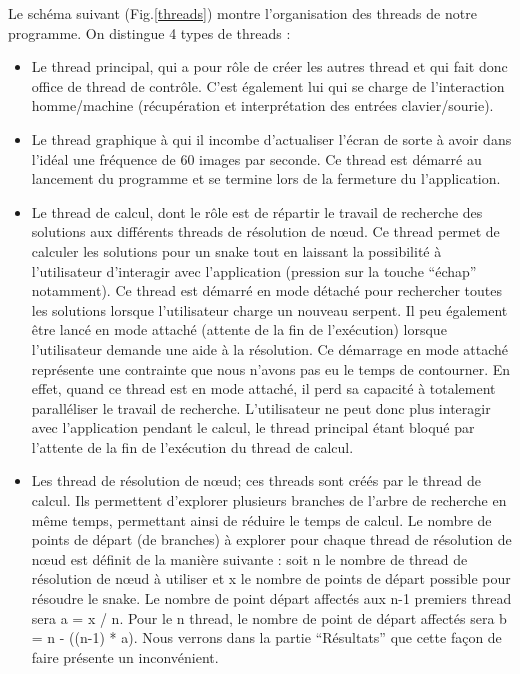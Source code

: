 Le schéma suivant (Fig.\ref{threads}) montre l'organisation des threads de notre programme. On distingue 4 types de threads :
\begin{itemize}
 \item Le thread principal, qui a pour rôle de créer les autres thread et qui fait donc office de thread de contrôle. C'est également lui qui se charge de l’interaction homme/machine (récupération et interprétation des entrées clavier/sourie).
 \item Le thread graphique à qui il incombe d'actualiser l'écran de sorte à avoir dans l'idéal une fréquence de 60 images par seconde. Ce thread est démarré au lancement du programme et se termine lors de la fermeture du l'application.
 \item Le thread de calcul, dont le rôle est de répartir le travail de recherche des solutions aux différents threads de résolution de nœud. Ce thread permet de calculer les solutions pour un snake tout en laissant la possibilité à l'utilisateur d'interagir avec l'application (pression sur la touche ``échap'' notamment). Ce thread est démarré en mode détaché pour rechercher toutes les solutions lorsque l'utilisateur charge un nouveau serpent. Il peu également être lancé en mode attaché (attente de la fin de l’exécution) lorsque l'utilisateur demande une aide à la résolution. Ce démarrage en mode attaché représente une contrainte que nous n'avons pas eu le temps de contourner. En effet, quand ce thread est en mode attaché, il perd sa capacité à totalement paralléliser le travail de recherche. L'utilisateur ne peut donc plus interagir avec l'application pendant le calcul, le thread principal étant bloqué par l'attente de la fin de l'exécution du thread de calcul.
 \item Les thread de résolution de nœud; ces threads sont créés par le thread de calcul. Ils permettent d'explorer plusieurs branches de l'arbre de recherche en même temps, permettant ainsi de réduire le temps de calcul. Le nombre de points de départ (de branches) à explorer pour chaque thread de résolution de nœud est définit de la manière suivante : soit n le nombre de thread de résolution de nœud à utiliser et x le nombre de points de départ possible pour résoudre le snake. Le nombre de point départ affectés aux n-1 premiers thread sera a = x / n. Pour le n thread, le nombre de point de départ affectés sera b = n - ((n-1) * a). Nous verrons dans la partie ``Résultats'' que cette façon de faire présente un inconvénient.
\end{itemize}

